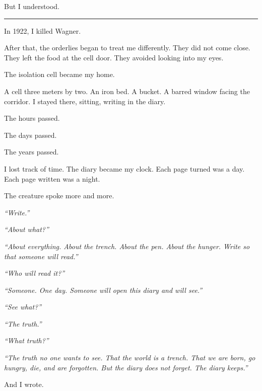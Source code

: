 \noindent But I understood.

\vspace{0.5em}\noindent\rule{\textwidth}{0.5pt}\vspace{0.5em}

\noindent In 1922, I killed Wagner.

\noindent After that, the orderlies began to treat me differently. They did not come close. They left the food at the cell door. They avoided looking into my eyes.

\noindent The isolation cell became my home.

\noindent A cell three meters by two. An iron bed. A bucket. A barred window facing the corridor. I stayed there, sitting, writing in the diary.

\noindent The hours passed.

\noindent The days passed.

\noindent The years passed.

\noindent I lost track of time. The diary became my clock. Each page turned was a day. Each page written was a night.

\noindent The creature spoke more and more.

\noindent \textit{\textquotedblleft{}Write.\textquotedblright{}}

\noindent \textit{\textquotedblleft{}About what?\textquotedblright{}}

\noindent \textit{\textquotedblleft{}About everything. About the trench. About the pen. About the hunger. Write so that someone will read.\textquotedblright{}}

\noindent \textit{\textquotedblleft{}Who will read it?\textquotedblright{}}

\noindent \textit{\textquotedblleft{}Someone. One day. Someone will open this diary and will see.\textquotedblright{}}

\noindent \textit{\textquotedblleft{}See what?\textquotedblright{}}

\noindent \textit{\textquotedblleft{}The truth.\textquotedblright{}}

\noindent \textit{\textquotedblleft{}What truth?\textquotedblright{}}

\noindent \textit{\textquotedblleft{}The truth no one wants to see. That the world is a trench. That we are born, go hungry, die, and are forgotten. But the diary does not forget. The diary keeps.\textquotedblright{}}

\noindent And I wrote.

